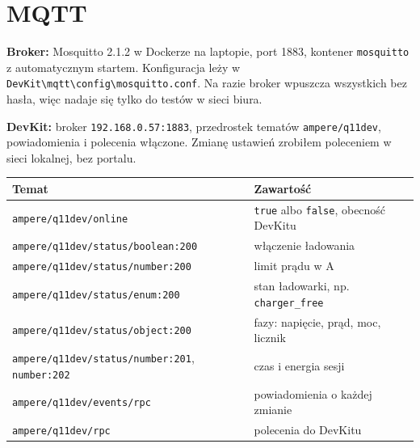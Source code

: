 \documentclass[11pt,a4paper]{article}
\begin{document}
\clearpage

\section{MQTT}

\textbf{Broker:} Mosquitto 2.1.2 w Dockerze na laptopie, port 1883, kontener \texttt{mosquitto} z automatycznym startem. Konfiguracja leży w \texttt{DevKit\textbackslash{}mqtt\textbackslash{}config\textbackslash{}mosquitto.\allowbreak{}conf}. Na razie broker wpuszcza wszystkich bez hasła, więc nadaje się tylko do testów w sieci biura.


\textbf{DevKit:} broker \texttt{192.\allowbreak{}168.\allowbreak{}0.\allowbreak{}57:\allowbreak{}1883}, przedrostek tematów \texttt{ampere/\allowbreak{}q11dev}, powiadomienia i polecenia włączone. Zmianę ustawień zrobiłem poleceniem w sieci lokalnej, bez portalu.


\begin{longtable}{>{\raggedright\arraybackslash}p{8.40cm}>{\raggedright\arraybackslash}p{7.32cm}}
\toprule
\rowcolor{apteallight}\textbf{Temat} & \textbf{Zawartość} \\
\midrule\endhead
\bottomrule\endfoot
\texttt{ampere/\allowbreak{}q11dev/\allowbreak{}online} & \texttt{true} albo \texttt{false}, obecność DevKitu \\
\texttt{ampere/\allowbreak{}q11dev/\allowbreak{}status/\allowbreak{}boolean:\allowbreak{}200} & włączenie ładowania \\
\texttt{ampere/\allowbreak{}q11dev/\allowbreak{}status/\allowbreak{}number:\allowbreak{}200} & limit prądu w A \\
\texttt{ampere/\allowbreak{}q11dev/\allowbreak{}status/\allowbreak{}enum:\allowbreak{}200} & stan ładowarki, np. \texttt{charger\_free} \\
\texttt{ampere/\allowbreak{}q11dev/\allowbreak{}status/\allowbreak{}object:\allowbreak{}200} & fazy: napięcie, prąd, moc, licznik \\
\texttt{ampere/\allowbreak{}q11dev/\allowbreak{}status/\allowbreak{}number:\allowbreak{}201}, \texttt{number:202} & czas i energia sesji \\
\texttt{ampere/\allowbreak{}q11dev/\allowbreak{}events/\allowbreak{}rpc} & powiadomienia o każdej zmianie \\
\texttt{ampere/\allowbreak{}q11dev/\allowbreak{}rpc} & polecenia do DevKitu \\
\end{longtable}
\end{document}
